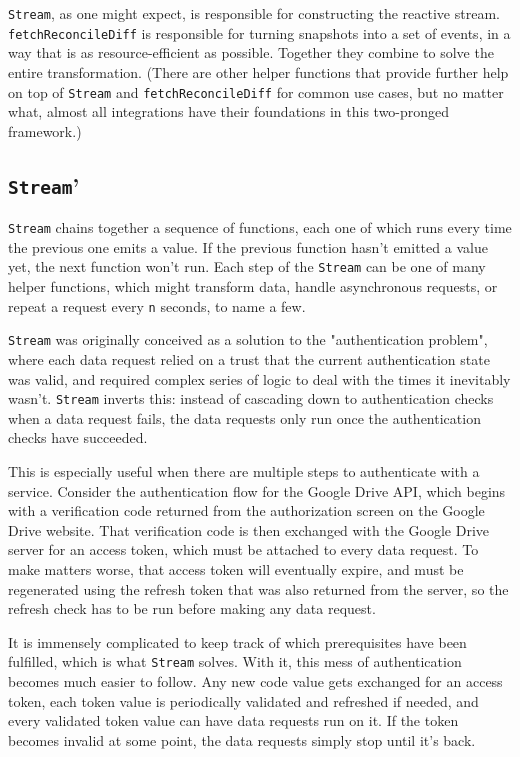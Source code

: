 \documentclass[manuscript,review,anonymous]{acmart}
\begin{document}
\texttt{Stream}, as one might expect, is responsible for constructing the reactive stream. \texttt{fetchReconcileDiff} is responsible for turning snapshots into a set of events, in a way that is as resource-efficient as possible. Together they combine to solve the entire transformation. (There are other helper functions that provide further help on top of \texttt{Stream} and \texttt{fetchReconcileDiff} for common use cases, but no matter what, almost all integrations have their foundations in this two-pronged framework.)

\subsection{\texttt{Stream}'}
\texttt{Stream} chains together a sequence of functions, each one of which runs every time the previous one emits a value. If the previous function hasn't emitted a value yet, the next function won't run. Each step of the \texttt{Stream} can be one of many helper functions, which might transform data, handle asynchronous requests, or repeat a request every \texttt{n} seconds,  to name a few. 

\texttt{Stream} was originally conceived as a solution to the "authentication problem", where each data request relied on a trust that the current authentication state was valid, and required complex series of logic to deal with the times it inevitably wasn't. \texttt{Stream} inverts this: instead of cascading down to authentication checks when a data request fails, the data requests only run once the authentication checks have succeeded. 

This is especially useful when there are multiple steps to authenticate with a service. Consider the authentication flow for the Google Drive API, which begins with a verification code returned from the authorization screen on the Google Drive website. That verification code is then exchanged with the Google Drive server for an access token, which must be attached to every data request. To make matters worse, that access token will eventually expire, and must be regenerated using the refresh token that was also returned from the server, so the refresh check has to be run before making any data request.~\cite{GoogleapinodejsclientREADMEmd}

It is immensely complicated to keep track of which prerequisites have been fulfilled, which is what \texttt{Stream} solves. With it, this mess of authentication becomes much easier to follow. Any new code value gets exchanged for an access token, each token value is periodically validated and refreshed if needed, and every validated token value can have data requests run on it. If the token becomes invalid at some point, the data requests simply stop until it's back.
\end{document}
